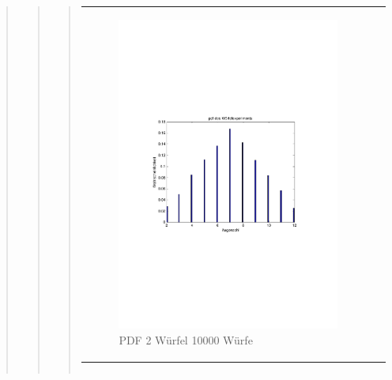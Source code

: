 \begin{quote}
\begin{quote}
\begin{quote}
\begin{center}
\begin{tabular}{ll}
\begin{minipage}{0.6\textwidth}
                    \begin{figure}[H]
                        \label{fig:}
                        \includegraphics[scale=0.6, trim = 3cm 8.5cm 3.5cm 8.5cm, clip]{./Bilder/2wuerfelpdf} %
                        \caption{PDF 2 Würfel 10000 Würfe}
                    \end{figure}
                \vspace{-1.5em}

                \end{minipage}

            \end{tabular}
            \end{center}

            \begin{center}
            \begin{tabular}{ll}


\end{tabular}
\end{center}
\end{quote}
\end{quote}
\end{quote}
